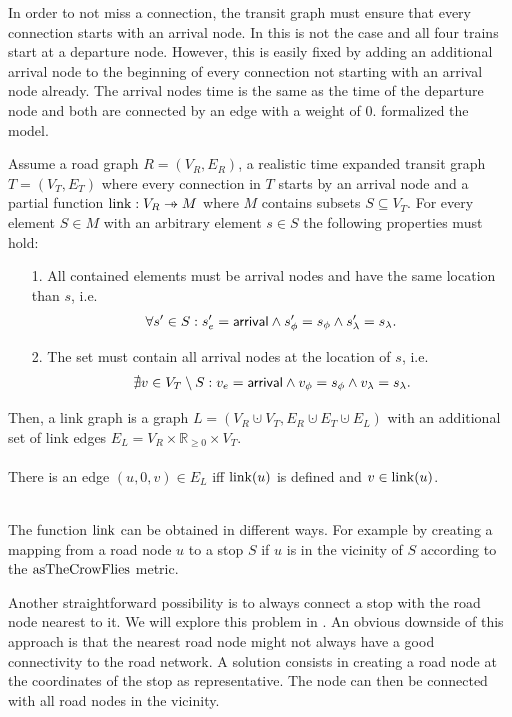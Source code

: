 	In order to not miss a connection, the transit graph must ensure that every connection starts with an arrival node.
	In  this is not the case and all four trains start at a departure node. However,
	this is easily fixed by adding an additional arrival node to the beginning of every connection not starting with an arrival node already.
	The arrival nodes time is the same as the time of the departure node and both are connected by an edge with a weight of $0$.
	 formalized the model.
	\begin{mydef}\label{linkGraph}
		Assume a road graph $R = (V_R, E_R)$, a realistic time expanded transit graph $T = (V_T, E_T)$ where
		every connection in $T$ starts by an arrival node and a partial function $\link: V_R \pto M$ where $M$
		contains subsets $S \subseteq V_T$. For every element $S \in M$ with an arbitrary element $s \in S$ the following
		properties must hold:
		\begin{itemize}
			\item[1.]
				All contained elements must be arrival nodes and have the same location than $s$, i.e.
				\begin{align*}
					\forall s' \in S: s'_e = \textsf{arrival} \land s'_\phi = s_\phi \land s'_\lambda = s_\lambda.
				\end{align*}
			\item[2.]
				The set must contain all arrival nodes at the location of $s$, i.e.
				\begin{align*}
					\nexists v \in V_T \setminus S: v_e = \textsf{arrival} \land v_\phi = s_\phi \land v_\lambda = s_\lambda.
				\end{align*}
		\end{itemize}
		Then, a \textnormal{link graph} is a graph $L = (V_R \cupdot V_T, E_R \cupdot E_T \cupdot E_L)$ with
		an additional set of link edges $E_L = V_R \times \mathbb{R}_{\ge 0} \times V_T$.\\\\
		There is an edge $(u, 0, v) \in E_L$ iff $\operatorname{link}(u)$ is defined and $v \in \operatorname{link}(u)$.
	\end{mydef}\quad\\
	The function $\operatorname{link}$ can be obtained in different ways. For example by creating a mapping from a road node $u$ to
	a stop $S$ if $u$ is in the vicinity of $S$ according to the $\operatorname{asTheCrowFlies}$ metric.
	
	Another straightforward possibility is to always connect a stop with the road node nearest to it. We will explore
	this problem in . An obvious downside of this approach is that the nearest road node
	might not always have a good connectivity to the road network. A solution consists in creating a road node at the coordinates
	of the stop as representative. The node can then be connected with all road nodes in the vicinity.

